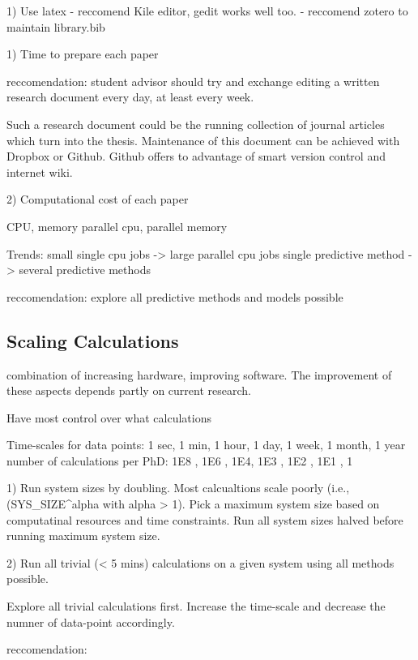 1) Use latex
- reccomend Kile editor, gedit works well too. 
- reccomend zotero to maintain library.bib

1) Time to prepare each paper

reccomendation: student advisor should try and exchange editing a written 
research document every day, at least every week.  

Such a research document could be the running 
collection of journal articles which turn into the thesis. Maintenance 
of this document can be achieved with Dropbox or Github.  Github 
offers to advantage of smart version control and internet wiki. 

2) Computational cost of each paper

CPU, memory
parallel cpu, parallel memory

Trends: 
small single cpu jobs -> large parallel cpu jobs
single predictive method -> several predictive methods

reccomendation: explore all predictive methods and models possible

\subsection{Scaling Calculations}

combination of increasing hardware, improving software.  The 
improvement of these aspects depends partly on current 
research.  

Have most control over what calculations

Time-scales for data points: 
1 sec, 1 min, 1 hour, 1 day, 1 week, 1 month, 1 year 
number of calculations per PhD:
1E8 , 1E6 , 1E4, 1E3 , 1E2 , 1E1 , 1

1) Run system sizes by doubling. Most calcualtions scale poorly (i.e., 
(SYS_SIZE^alpha with alpha > 1). Pick a maximum system size based 
on computatinal resources and time constraints.  Run all system sizes 
halved before running maximum system size. 

2) Run all trivial (< 5 mins) calculations on a given system using all 
methods possible. 

Explore all trivial calculations first. Increase the time-scale and 
decrease the numner of data-point accordingly. 

reccomendation: 


